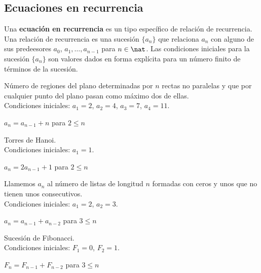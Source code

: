 \subsection{Ecuaciones en recurrencia}
\begin{ndef}
    Una \textbf{ecuación en recurrencia} es un tipo específico de relación de recurrencia. Una relación de recurrencia es una sucesión $\{a_{n}\}$ que relaciona $a_{n}$ con
    alguno de sus predeesores $a_{0}$, $a_{1}, \ldots , a_{n-1}$ para $n \in \nat$. Las condiciones iniciales para la sucesión $\{a_{n}\}$ son valores dados en forma explícita
    para un número finito de términos de la sucesión.
\end{ndef}
\begin{ejemplo}
    Número de regiones del plano determinadas por $n$ rectas no paralelas y que por cualquier punto del plano pasan como máximo dos de ellas.
    \\
    Condiciones iniciales: $a_{1} = 2$, $a_{2} = 4$, $a_{3} = 7$, $a_{4} = 11$.
    \begin{center}
        $a_{n} = a_{n-1} + n$  para  $2 \leq n$
    \end{center}
\end{ejemplo}

\begin{ejemplo}
    Torres de Hanoi.
    \\
    Condiciones iniciales: $a_{1} = 1.$
    \begin{center}
        $a_{n} = 2a_{n-1} + 1$  para  $2 \leq n$
    \end{center}
\end{ejemplo}

\begin{ejemplo}
    Llamemos $a_{n}$ al número de listas de longitud $n$ formadas con ceros y unos que no tienen unos consecutivos.
    \\
    Condiciones iniciales: $a_{1} = 2$, $a_{2} = 3.$
    \begin{center}
        $a_{n} = a_{n-1} + a_{n-2}$  para  $3 \leq n$
    \end{center}
\end{ejemplo}

\begin{ejemplo}
    Sucesión de Fibonacci.
    \\
    Condiciones iniciales: $F_{1} = 0$, $F_{2} = 1.$
    \begin{center}
        $F_{n} = F_{n-1} + F_{n-2}$  para  $3 \leq n$
    \end{center}
\end{ejemplo}

